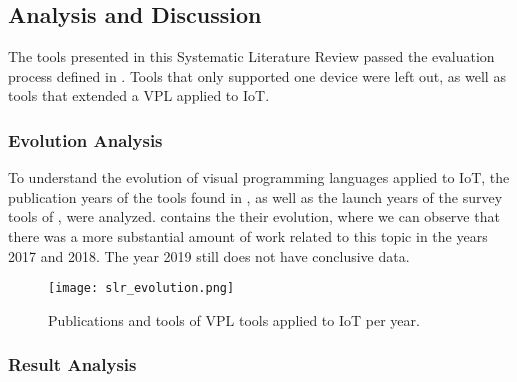 \subsection{Analysis and Discussion}\label{sec:slr_discussion}

The tools presented in this Systematic Literature Review passed the evaluation process defined in . Tools that only supported one device were left out, as well as tools that extended a VPL applied to IoT. 

\subsubsection{Evolution Analysis}\label{sec:articles_nr_analysis}

To understand the evolution of visual programming languages applied to IoT, the publication years of the tools found in , as well as the launch years of the survey tools of , were analyzed.  contains the their evolution, where we can observe that there was a more substantial amount of work related to this topic in the years 2017 and 2018. The year 2019 still does not have conclusive data.

\begin{figure}[h]
\centering
\texttt{[image: slr\_evolution.png]}
\caption{Publications and tools of VPL tools applied to IoT per year.}\label{fig:slr_evolution}
\end{figure}

\subsubsection{Result Analysis}\label{sec:result_analysis}


